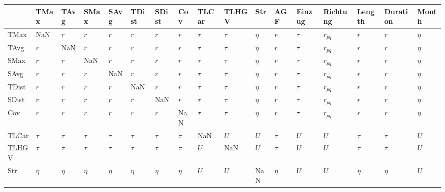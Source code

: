 \begin{tabular}{lllllllllllllllll}
\toprule
{} &      TMax &      TAvg &      SMax &      SAvg &     TDist &     SDist &       Cov &   TLCar &   TLHGV &     Str &       AGF &  Einzug &  Richtung &    Length &  Duration &   Month \\
\midrule
TMax     &       NaN &       $r$ &       $r$ &       $r$ &       $r$ &       $r$ &       $r$ &  $\tau$ &  $\tau$ &  $\eta$ &       $r$ &  $\tau$ &  $r_{pq}$ &       $r$ &       $r$ &  $\eta$ \\
TAvg     &       $r$ &       NaN &       $r$ &       $r$ &       $r$ &       $r$ &       $r$ &  $\tau$ &  $\tau$ &  $\eta$ &       $r$ &  $\tau$ &  $r_{pq}$ &       $r$ &       $r$ &  $\eta$ \\
SMax     &       $r$ &       $r$ &       NaN &       $r$ &       $r$ &       $r$ &       $r$ &  $\tau$ &  $\tau$ &  $\eta$ &       $r$ &  $\tau$ &  $r_{pq}$ &       $r$ &       $r$ &  $\eta$ \\
SAvg     &       $r$ &       $r$ &       $r$ &       NaN &       $r$ &       $r$ &       $r$ &  $\tau$ &  $\tau$ &  $\eta$ &       $r$ &  $\tau$ &  $r_{pq}$ &       $r$ &       $r$ &  $\eta$ \\
TDist    &       $r$ &       $r$ &       $r$ &       $r$ &       NaN &       $r$ &       $r$ &  $\tau$ &  $\tau$ &  $\eta$ &       $r$ &  $\tau$ &  $r_{pq}$ &       $r$ &       $r$ &  $\eta$ \\
SDist    &       $r$ &       $r$ &       $r$ &       $r$ &       $r$ &       NaN &       $r$ &  $\tau$ &  $\tau$ &  $\eta$ &       $r$ &  $\tau$ &  $r_{pq}$ &       $r$ &       $r$ &  $\eta$ \\
Cov      &       $r$ &       $r$ &       $r$ &       $r$ &       $r$ &       $r$ &       NaN &  $\tau$ &  $\tau$ &  $\eta$ &       $r$ &  $\tau$ &  $r_{pq}$ &       $r$ &       $r$ &  $\eta$ \\
TLCar    &    $\tau$ &    $\tau$ &    $\tau$ &    $\tau$ &    $\tau$ &    $\tau$ &    $\tau$ &     NaN &     $U$ &     $U$ &    $\tau$ &     $U$ &       $U$ &    $\tau$ &    $\tau$ &     $U$ \\
TLHGV    &    $\tau$ &    $\tau$ &    $\tau$ &    $\tau$ &    $\tau$ &    $\tau$ &    $\tau$ &     $U$ &     NaN &     $U$ &    $\tau$ &     $U$ &       $U$ &    $\tau$ &    $\tau$ &     $U$ \\
Str      &    $\eta$ &    $\eta$ &    $\eta$ &    $\eta$ &    $\eta$ &    $\eta$ &    $\eta$ &     $U$ &     $U$ &     NaN &    $\eta$ &     $U$ &       $U$ &    $\eta$ &    $\eta$ &     $U$ \\

\end{tabular}
